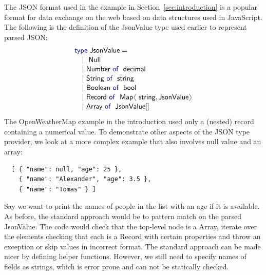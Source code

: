 \documentclass[preprint]{sigplanconf}
\newcommand{\langl}{\begin{picture}(4.5,7)
\put(1.1,2.5){\rotatebox{60}{\line(1,0){5.5}}}
\put(1.1,2.5){\rotatebox{300}{\line(1,0){5.5}}}
\end{picture}}
\newcommand{\rangl}{\begin{picture}(4.5,7)
\put(.9,2.5){\rotatebox{120}{\line(1,0){5.5}}}
\put(.9,2.5){\rotatebox{240}{\line(1,0){5.5}}}
\end{picture}}
\newcommand{\kvd}[1]{\textnormal{\textcolor{kvdclr}{\sffamily #1}}}
\newcommand{\ident}[1]{\textnormal{\sffamily #1}}
\begin{document}
The JSON format used in the example in Section~\ref{sec:introduction} is a popular format for data
exchange on the web based on data structures used in JavaScript. The following is the definition 
of the \ident{JsonValue} type used earlier to represent parsed JSON:
%
\begin{equation*}
\begin{array}{l}
 \kvd{type}~\ident{JsonValue} = \\[0.1em]
 \quad|~\ident{Null} \\[0.1em]
 \quad|~\ident{Number}~\kvd{of}~\ident{decimal} \\[0.1em]
 \quad|~\ident{String}~\kvd{of}~\ident{string} \\[0.1em]
 \quad|~\ident{Boolean}~\kvd{of}~\ident{bool} \\[0.1em]
 \quad|~\ident{Record}~\kvd{of}~\ident{Map}\langl\ident{string}, \ident{JsonValue}\rangl \\[0.1em]
 \quad|~\ident{Array}~\kvd{of}~\ident{JsonValue}[] \\[0.1em]
\end{array}
\end{equation*}
%
The OpenWeatherMap example in the introduction used only a (nested) record containing a numerical
value. To demonstrate other aspects of the JSON type provider, we look at a more complex example
that also involves \kvd{null} value and an array:
%
{\small{
\begin{verbatim}
  [ { "name": null, "age": 25 },
    { "name": "Alexander", "age": 3.5 },
    { "name": "Tomas" } ]
\end{verbatim}
}}
%
\noindent
Say we want to print the names of people in the list with an age if it is available. As before, 
the standard approach would be to pattern match on the parsed \ident{JsonValue}. The code would 
check that the top-level node is a \ident{Array}, iterate over the elements checking that each is
a \ident{Record} with certain properties and throw an exception or skip values in incorrect format.
The standard approach can be made nicer by defining helper functions. However, we still need to
specify names of fields as strings, which is error prone and can not be statically checked.
\end{document}
